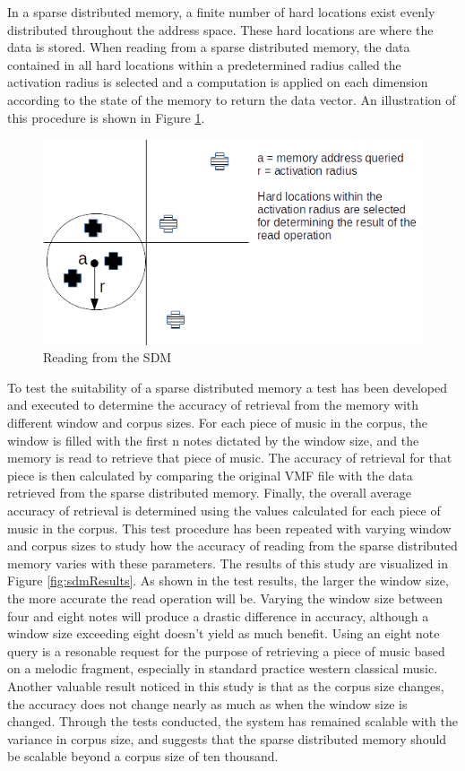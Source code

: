 In a sparse distributed memory, a finite number of hard locations exist evenly distributed throughout the address space. These hard locations are where the data is stored. When reading from a sparse distributed memory, the data contained in all hard locations within a predetermined radius called the activation radius is selected and a computation is applied on each dimension according to the state of the memory to return the data vector. An illustration of this procedure is shown in Figure \ref{fig:readingFromSDM}.

\begin{figure}
  \begin{center}
    \includegraphics[scale=.75]{resources/sdmRead.png}
    \caption{Reading from the SDM}
    \label{fig:readingFromSDM}
  \end{center}
\end{figure}

To test the suitability of a sparse distributed memory a test has been developed and executed to determine the accuracy of retrieval from the memory with different window and corpus sizes. For each piece of music in the corpus, the window is filled with the first n notes dictated by the window size, and the memory is read to retrieve that piece of music. The accuracy of retrieval for that piece is then calculated by comparing the original VMF file with the data retrieved from the sparse distributed memory. Finally, the overall average accuracy of retrieval is determined using the values calculated for each piece of music in the corpus. This test procedure has been repeated with varying window and corpus sizes to study how the accuracy of reading from the sparse distributed memory varies with these parameters. The results of this study are visualized in Figure \ref{fig:sdmResults}. As shown in the test results, the larger the window size, the more accurate the read operation will be. Varying the window size between four and eight notes will produce a drastic difference in accuracy, although a window size exceeding eight doesn't yield as much benefit. Using an eight note query is a resonable request for the purpose of retrieving a piece of music based on a melodic fragment, especially in standard practice western classical music. Another valuable result noticed in this study is that as the corpus size changes, the accuracy does not change nearly as much as when the window size is changed. Through the tests conducted, the system has remained scalable with the variance in corpus size, and suggests that the sparse distributed memory should be scalable beyond a corpus size of ten thousand. 

